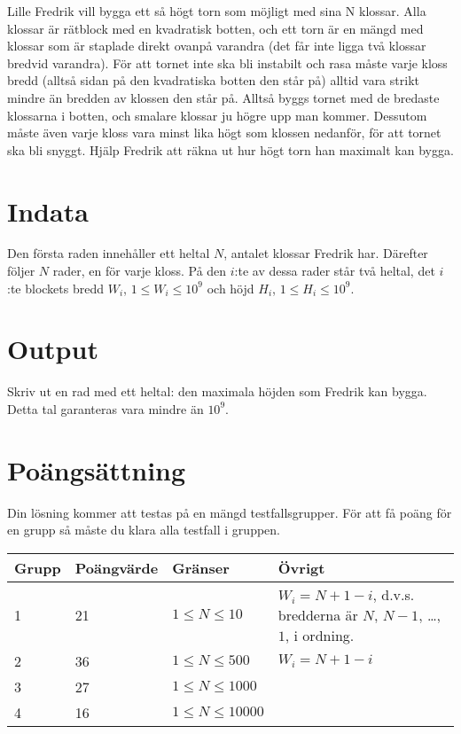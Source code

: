 Lille Fredrik vill bygga ett så högt torn som möjligt med sina N klossar. Alla klossar är rätblock med en kvadratisk botten, och ett torn är en mängd med klossar som är staplade direkt ovanpå varandra (det får inte ligga två klossar bredvid varandra). För att tornet inte ska bli instabilt och rasa måste varje kloss bredd (alltså sidan på den kvadratiska botten den står på) alltid vara strikt mindre än bredden av klossen den står på. Alltså byggs tornet med de bredaste klossarna i botten, och smalare klossar ju högre upp man kommer. Dessutom måste även varje kloss vara minst lika högt som klossen nedanför, för att tornet ska bli snyggt. Hjälp Fredrik att räkna ut hur högt torn han maximalt kan bygga.

\section*{Indata}
Den första raden innehåller ett heltal $N$, antalet klossar Fredrik har. Därefter följer $N$ rader, en för varje kloss. På den $i$:te av dessa rader står två heltal, det $i$:te blockets bredd $W_i$, $1 \leq W_i \leq 10^9$ och höjd $H_i$, $1 \leq H_i \leq 10^9$.

\section*{Output}
Skriv ut en rad med ett heltal: den maximala höjden som Fredrik kan bygga. Detta tal garanteras vara mindre än $10^9$.

\section*{Poängsättning}
Din lösning kommer att testas på en mängd testfallsgrupper. För att få poäng för en grupp så måste du klara alla testfall i gruppen.

\begin{tabular}{|l|l|l|l|}
\hline
Grupp & Poängvärde & Gränser & Övrigt \\ \hline
1     & 21         & $1 \leq N \leq 10$ & $W_i = N+1 - i$, d.v.s. bredderna är $N$, $N-1$, \dots, $1$, i ordning. \\ \hline
2     & 36         & $1 \leq N \leq 500$ & $W_i = N+1 - i$ \\ \hline
3     & 27         & $1 \leq N \leq 1000$ & \\ \hline
4     & 16         & $1 \leq N \leq 10000$ & \\ \hline
\end{tabular}
